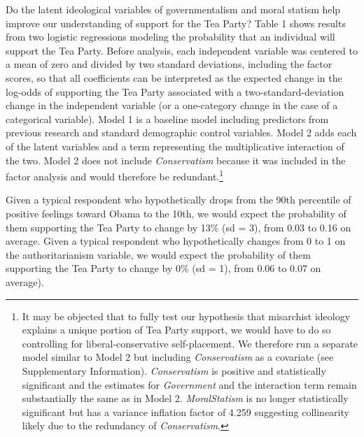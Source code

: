 \documentclass[12pt,]{article}
\begin{document}
Do the latent ideological variables of governmentalism and moral statism
help improve our understanding of support for the Tea Party? Table 1
shows results from two logistic regressions modeling the probability
that an individual will support the Tea Party. Before analysis, each
independent variable was centered to a mean of zero and divided by two
standard deviations, including the factor scores, so that all
coefficients can be interpreted as the expected change in the log-odds
of supporting the Tea Party associated with a two-standard-deviation
change in the independent variable (or a one-category change in the case
of a categorical variable). Model 1 is a baseline model including
predictors from previous research and standard demographic control
variables. Model 2 adds each of the latent variables and a term
representing the multiplicative interaction of the two. Model 2 does not
include \emph{Conservatism} because it was included in the factor
analysis and would therefore be redundant.\footnote{It may be objected
  that to fully test our hypothesis that misarchist ideology explains a
  unique portion of Tea Party support, we would have to do so
  controlling for liberal-conservative self-placement. We therefore run
  a separate model similar to Model 2 but including \emph{Conservatism}
  as a covariate (see Supplementary Information). \emph{Conservatism} is
  positive and statistically significant and the estimates for
  \emph{Government} and the interaction term remain substantially the
  same as in Model 2. \emph{MoralStatism} is no longer statistically
  significant but has a variance inflation factor of 4.259 suggesting
  collinearity likely due to the redundancy of \emph{Conservatism}.}

Given a typical respondent who hypothetically drops from the 90th
percentile of positive feelings toward Obama to the 10th, we would
expect the probability of them supporting the Tea Party to change by
13\% (sd = 3), from 0.03 to 0.16 on average. Given a typical respondent
who hypothetically changes from 0 to 1 on the authoritarianism variable,
we would expect the probability of them supporting the Tea Party to
change by 0\% (sd = 1), from 0.06 to 0.07 on average).
\end{document}
